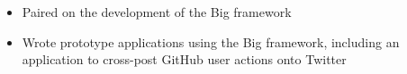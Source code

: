 \begin{itemize}
  \item Paired on the development of the Big framework
  \item Wrote prototype applications using the Big framework, including an
  application to cross-post GitHub user actions onto Twitter
\end{itemize}

